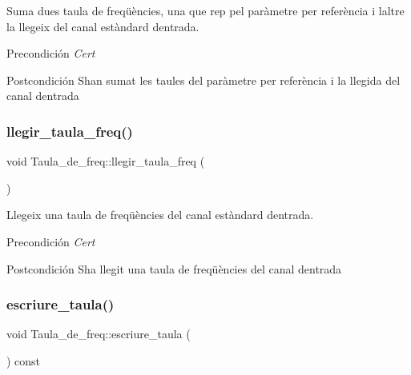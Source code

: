 Suma dues taula de freqüències, una que rep pel paràmetre per referència i l\textquotesingle{}altre la llegeix del canal estàndard d\textquotesingle{}entrada. 

\begin{DoxyPrecond}{Precondición}
{\itshape Cert} 
\end{DoxyPrecond}
\begin{DoxyPostcond}{Postcondición}
S\textquotesingle{}han sumat les taules del paràmetre per referència i la llegida del canal d\textquotesingle{}entrada 
\end{DoxyPostcond}
\mbox{\label{class_taula__de__freq_a6e3d7bfaa7227f9b7603864c7a3da2cf}} 
\subsubsection{\texorpdfstring{llegir\+\_\+taula\+\_\+freq()}{llegir\_taula\_freq()}}
{\footnotesize\ttfamily void Taula\+\_\+de\+\_\+freq\+::llegir\+\_\+taula\+\_\+freq (\begin{DoxyParamCaption}{ }\end{DoxyParamCaption})}



Llegeix una taula de freqüències del canal estàndard d\textquotesingle{}entrada. 

\begin{DoxyPrecond}{Precondición}
{\itshape Cert} 
\end{DoxyPrecond}
\begin{DoxyPostcond}{Postcondición}
S\textquotesingle{}ha llegit una taula de freqüències del canal d\textquotesingle{}entrada 
\end{DoxyPostcond}
\mbox{\label{class_taula__de__freq_a2b32d909aea13d0e4837faf4b439f181}} 
\subsubsection{\texorpdfstring{escriure\+\_\+taula()}{escriure\_taula()}}
{\footnotesize\ttfamily void Taula\+\_\+de\+\_\+freq\+::escriure\+\_\+taula (\begin{DoxyParamCaption}{ }\end{DoxyParamCaption}) const}



